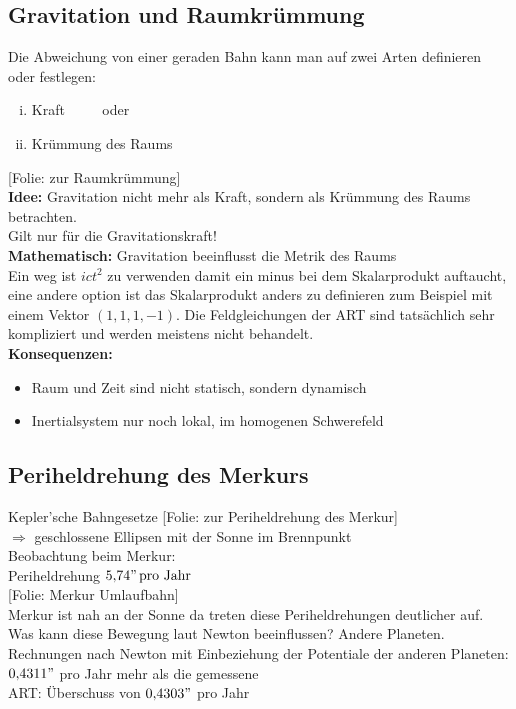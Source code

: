 \documentclass[titlepage,11pt,a4paper,ngerman]{report}
\newcommand{\tx}[1]{\textrm{#1}}
\newcommand{\folie}[1]{\color{gray}[Folie: #1]\color{black}}
\newcommand{\lcom}[1]{\color{MidnightBlue}#1\color{black}}
\begin{document}
\subsection{Gravitation und Raumkrümmung}
Die Abweichung von einer geraden Bahn kann man auf zwei Arten definieren oder festlegen:
\begin{enumerate}[(i)]
	\item Kraft $ \qquad $ oder
	\item Krümmung des Raums
\end{enumerate}
\folie{zur Raumkrümmung}\\
\textbf{Idee:} Gravitation nicht mehr als Kraft, sondern als Krümmung des Raums betrachten.\\
\lcom{Gilt nur für die Gravitationskraft!}\\
\textbf{Mathematisch:} Gravitation beeinflusst die Metrik des Raums\\[5pt]
\lcom{Ein weg ist $ict^2$ zu verwenden damit ein minus bei dem Skalarprodukt auftaucht, eine andere option ist das Skalarprodukt anders zu definieren zum Beispiel mit einem Vektor $(1,1,1,-1)$. Die Feldgleichungen der ART sind tatsächlich sehr kompliziert und werden meistens nicht behandelt.}\\
\textbf{Konsequenzen:}
\begin{itemize}
	\item Raum und Zeit sind nicht statisch, sondern dynamisch
	\item Inertialsystem nur noch lokal, im homogenen Schwerefeld
\end{itemize}

\subsection{Periheldrehung des Merkurs}

Kepler'sche Bahngesetze \folie{zur Periheldrehung des Merkur}\\
$ \Rightarrow $ geschlossene Ellipsen mit der Sonne im Brennpunkt\\[5pt]
Beobachtung beim Merkur:\\
Periheldrehung $ 5{,}74" \, \tx{pro Jahr} $\\[5pt]
\folie{Merkur Umlaufbahn}\\
\lcom{Merkur ist nah an der Sonne da treten diese Periheldrehungen deutlicher auf. Was kann diese Bewegung laut Newton beeinflussen? Andere Planeten.}\\
Rechnungen nach Newton mit Einbeziehung der Potentiale der anderen Planeten: $ 0{,}4311" $ pro Jahr mehr als die gemessene\\[5pt]
ART: Überschuss von $ 0{,}4303" $ pro Jahr
\end{document}

